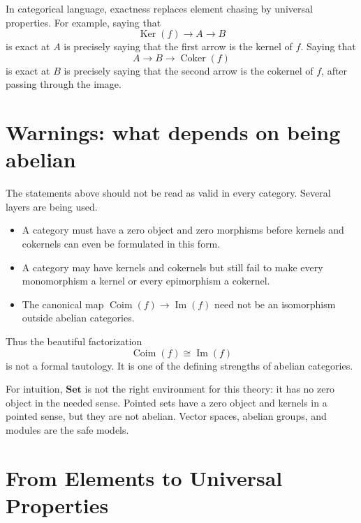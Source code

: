 In categorical language, exactness replaces element chasing by universal properties.  For example, saying that
\[
  \operatorname{Ker}(f)\to A\to B
\]
is exact at \(A\) is precisely saying that the first arrow is the kernel of \(f\).  Saying that
\[
  A\to B\to \operatorname{Coker}(f)
\]
is exact at \(B\) is precisely saying that the second arrow is the cokernel of \(f\), after passing through the image.

\section{Warnings: what depends on being abelian}

The statements above should not be read as valid in every category.  Several layers are being used.
\begin{itemize}
  \item A category must have a zero object and zero morphisms before kernels and cokernels can even be formulated in this form.
  \item A category may have kernels and cokernels but still fail to make every monomorphism a kernel or every epimorphism a cokernel.
  \item The canonical map \(\operatorname{Coim}(f)\to\operatorname{Im}(f)\) need not be an isomorphism outside abelian categories.
\end{itemize}
Thus the beautiful factorization
\[
  \operatorname{Coim}(f)\cong \operatorname{Im}(f)
\]
is not a formal tautology.  It is one of the defining strengths of abelian categories.

For intuition, \(\mathbf{Set}\) is not the right environment for this theory: it has no zero object in the needed sense.  Pointed sets have a zero object and kernels in a pointed sense, but they are not abelian.  Vector spaces, abelian groups, and modules are the safe models.

\section{From Elements to Universal Properties}

